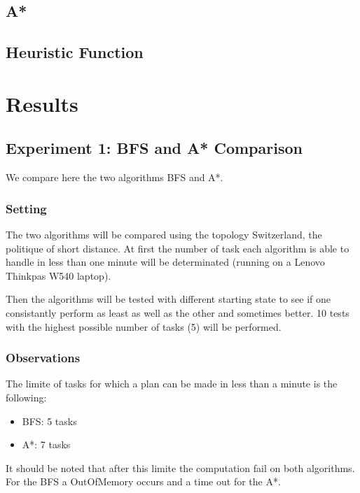 \documentclass[11pt]{article}
\begin{document}

\subsection{A*}


\subsection{Heuristic Function}



\section{Results}

\subsection{Experiment 1: BFS and A* Comparison}
We compare here the two algorithms BFS and A*. 

\subsubsection{Setting}
The two algorithms will be compared using the topology Switzerland, the politique of short distance. At first the number of task each algorithm is able to handle in less than one minute will be determinated (running on a Lenovo Thinkpas W540 laptop).

Then the algorithms will be tested with different starting state to see if one consistantly perform as least as well as the other and sometimes better. 10 tests with the highest possible number of tasks (5) will be performed. 
\subsubsection{Observations}
The limite of tasks for which a plan can be made in less than a minute is the following:
\begin{itemize}
  \item BFS: 5 tasks
  \item A*: 7 tasks
\end{itemize}
It should be noted that after this limite the computation fail on both algorithms. For the BFS a OutOfMemory occurs and a time out for the A*.
\end{document}
